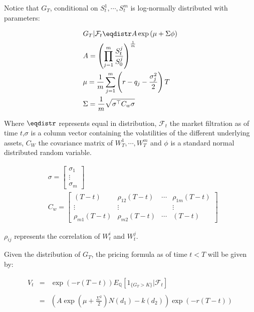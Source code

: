 Notice that $G_T$, conditional on $S_t^1,\cdots,S_t^m$ is log-normally distributed with parameters:



\begin{equation} 
\label{eq:geom_digital_distrib_params1}
\begin{aligned} 
& G_T|\mathcal{F}_t \eqdistr A \exp\left(\mu+\Sigma\phi\right)\\
& A = \left(\prod_{j=1}^m\frac{S_{t}^{j}}{S_{0}^{j}}\right)^{\frac{1}{m}} \\
&\mu = \frac{1}{m}\sum_{j=1}^{m}\left(r-q_{j}-\frac{\sigma_{j}^{2}}{2}\right)T \\   
& \Sigma=\frac{1}{m}\sqrt{\sigma^{\top} C_{w} \sigma}
\end{aligned}
\end{equation}

Where $\eqdistr$ represents equal in distribution, $\mathcal{F}_t$ the market filtration as of time $t$,$\sigma$ is a column vector containing the volatilities of the different underlying assets, $C_W$ the covariance matrix of $W_T^1,\cdots,W_T^m$ and $\phi$ is a standard normal distributed random variable.

\begin{equation} \label{eq:geom_digital_distrib_params2}
\begin{aligned}
&\sigma=\left[\begin{array}{c}
\sigma_{1} \\
\vdots \\
\sigma_{m}
\end{array}\right] \\
&C_{w}=\left[\begin{array}{cccc}
\left(T-t\right) & \rho_{12} \left(T-t\right) & \cdots & \rho_{1 m} \left(T-t\right) \\
\vdots & \vdots & & \vdots \\
\rho_{m 1} \left(T-t\right) & \rho_{m 2} \left(T-t\right) & \cdots &  \left(T-t\right)
\end{array}\right]
\end{aligned}
\end{equation} 

$\rho_{ij}$ represents the correlation of $W_t^i$ and $W_t^j$.

Given the distribution of $G_T$, the pricing formula as of time $t<T$ will be given by:

$$
\begin{array}{lll}
V_{t}&=&\exp (-r(T-t)) E_{\mathbb{Q}}\left[1_{\{G_{T}>K\}} | \mathcal{F}_t\right] \\
&& \\
&=&\left(A\exp\left(\mu+\frac{\Sigma^2}{2}\right)N\left(d_1\right)-k\left(d_2\right)\right)\exp\left(-r(T-t)\right)
\end{array}
$$

